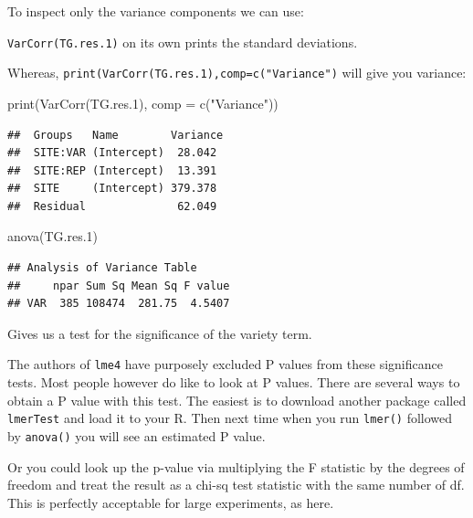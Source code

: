 \documentclass[
]{book}
\makeatletter
\newenvironment{Shaded}{\begin{snugshade}}{\end{snugshade}}
\newcommand{\AttributeTok}[1]{\textcolor[rgb]{0.77,0.63,0.00}{#1}}
\newcommand{\FloatTok}[1]{\textcolor[rgb]{0.00,0.00,0.81}{#1}}
\newcommand{\FunctionTok}[1]{\textcolor[rgb]{0.00,0.00,0.00}{#1}}
\newcommand{\NormalTok}[1]{#1}
\newcommand{\StringTok}[1]{\textcolor[rgb]{0.31,0.60,0.02}{#1}}
\newenvironment{kframe}{%
\medskip{}
\setlength{\fboxsep}{.8em}
 \def\at@end@of@kframe{}%
 \ifinner\ifhmode%
  \def\at@end@of@kframe{\end{minipage}}%
  \begin{minipage}{\columnwidth}%
 \fi\fi%
 \def\FrameCommand##1{\hskip\@totalleftmargin \hskip-\fboxsep
 \colorbox{shadecolor}{##1}\hskip-\fboxsep
     \hskip-\linewidth \hskip-\@totalleftmargin \hskip\columnwidth}%
 \MakeFramed {\advance\hsize-\width
   \@totalleftmargin\z@ \linewidth\hsize
   \@setminipage}}%
 {\par\unskip\endMakeFramed%
 \at@end@of@kframe}
\newenvironment{rmdblock}[1]
  {
  \begin{itemize}
  \renewcommand{\labelitemi}{
    \raisebox{-.7\height}[0pt][0pt]{
      {\setkeys{Gin}{width=3em,keepaspectratio}\texttt{[image: images/\#1]}}
    }
  }
  \setlength{\fboxsep}{1em}
  \begin{kframe}
  \item
  }
  {
  \end{kframe}
  \end{itemize}
  }
\newenvironment{rmdnote}
  {\begin{rmdblock}{note}}
  {\end{rmdblock}}
\makeatother
\begin{document}
To inspect only the variance components we can use:

\texttt{VarCorr(TG.res.1)} on its own prints the standard deviations.

Whereas, \texttt{print(VarCorr(TG.res.1),comp=c("Variance")} will give you variance:

\begin{Shaded}
\begin{Highlighting}[]
\FunctionTok{print}\NormalTok{(}\FunctionTok{VarCorr}\NormalTok{(TG.res}\FloatTok{.1}\NormalTok{), }\AttributeTok{comp =} \FunctionTok{c}\NormalTok{(}\StringTok{"Variance"}\NormalTok{))}
\end{Highlighting}
\end{Shaded}

\begin{verbatim}
##  Groups   Name        Variance
##  SITE:VAR (Intercept)  28.042 
##  SITE:REP (Intercept)  13.391 
##  SITE     (Intercept) 379.378 
##  Residual              62.049
\end{verbatim}

\begin{Shaded}
\begin{Highlighting}[]
\FunctionTok{anova}\NormalTok{(TG.res}\FloatTok{.1}\NormalTok{)}
\end{Highlighting}
\end{Shaded}

\begin{verbatim}
## Analysis of Variance Table
##     npar Sum Sq Mean Sq F value
## VAR  385 108474  281.75  4.5407
\end{verbatim}

Gives us a test for the significance of the variety term.

\begin{rmdnote}
The authors of \texttt{lme4} have purposely excluded P values from these significance tests. Most people however do like to look at P values. There are several ways to obtain a P value with this test. The easiest is to download another package called \texttt{lmerTest} and load it to your R. Then next time when you run \texttt{lmer()} followed by \texttt{anova()} you will see an estimated P value.

Or you could look up the p-value via multiplying the F statistic by the degrees of freedom and treat the result as a chi-sq test statistic with the same number of df. This is perfectly acceptable for large experiments, as here.
\end{rmdnote}
\end{document}

